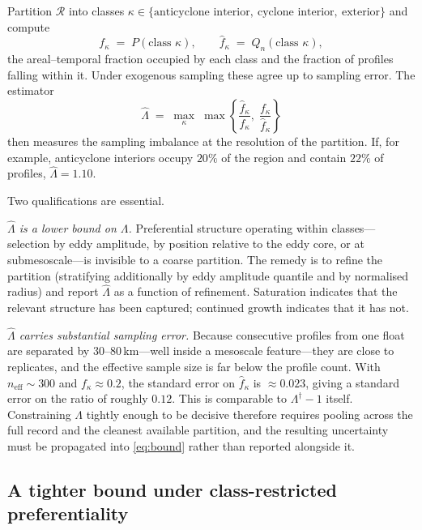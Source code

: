 Partition $\mathcal{R}$ into classes $\kappa \in \{\text{anticyclone interior},\
\text{cyclone interior},\ \text{exterior}\}$ and compute
\begin{equation}
  f_\kappa \;=\; P(\text{class }\kappa),
  \qquad
  \hat{f}_\kappa \;=\; Q_n(\text{class }\kappa),
\end{equation}
the areal--temporal fraction occupied by each class and the fraction of profiles falling
within it. Under exogenous sampling these agree up to sampling error. The estimator
\begin{equation}
  \label{eq:lambdahat}
  \hat{\Lambda} \;=\; \max_{\kappa} \; \max\!\left\{ \frac{\hat{f}_\kappa}{f_\kappa},\;
  \frac{f_\kappa}{\hat{f}_\kappa} \right\}
\end{equation}
then measures the sampling imbalance at the resolution of the partition. If, for example,
anticyclone interiors occupy $20\%$ of the region and contain $22\%$ of profiles,
$\hat\Lambda = 1.10$.

Two qualifications are essential.

\emph{$\hat\Lambda$ is a lower bound on $\Lambda$.} Preferential structure operating within
classes---selection by eddy amplitude, by position relative to the eddy core, or at
submesoscale---is invisible to a coarse partition. The remedy is to refine the partition
(stratifying additionally by eddy amplitude quantile and by normalised radius) and report
$\hat\Lambda$ as a function of refinement. Saturation indicates that the relevant structure
has been captured; continued growth indicates that it has not.

\emph{$\hat\Lambda$ carries substantial sampling error.} Because consecutive profiles from one
float are separated by $30$--$80$\,km---well inside a mesoscale feature---they are close to
replicates, and the effective sample size is far below the profile count. With $n_{\text{eff}}
\sim 300$ and $f_\kappa \approx 0.2$, the standard error on $\hat f_\kappa$ is
$\approx 0.023$, giving a standard error on the ratio of roughly $0.12$. This is comparable to
$\Lambda^\dagger - 1$ itself. Constraining $\Lambda$ tightly enough to be decisive therefore
requires pooling across the full record and the cleanest available partition, and the
resulting uncertainty must be propagated into \eqref{eq:bound} rather than reported alongside
it.

\subsection{A tighter bound under class-restricted preferentiality}
\label{sec:refinement}

